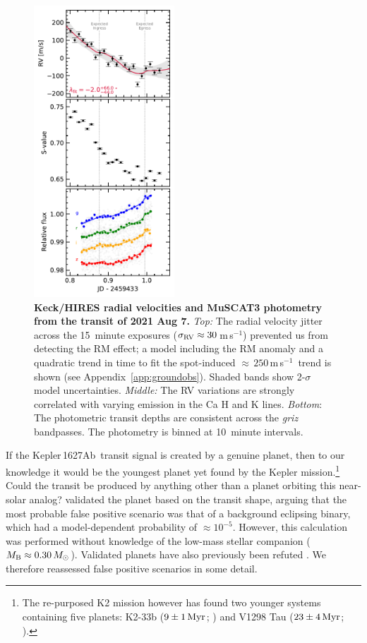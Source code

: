 \documentclass[12pt,modern,twocolumn,tighten]{aastex63}
\newcommand{\pn}{Kepler\,1627Ab} %
\newcommand{\ms}{\,m\,s$^{-1}$}
\begin{document}
\begin{figure}[tp]
	\begin{center}
		\leavevmode
		\includegraphics[width=0.47\textwidth]{f7.pdf}
	\end{center}
	\vspace{-0.7cm}
	\caption{
		{\bf Keck/HIRES radial velocities and MuSCAT3 photometry from the transit of 2021 Aug 7.}
		{\it Top:} 
		The radial velocity jitter across the 15~minute exposures
		($\sigma_{\rm RV}\approx30$\ms) prevented us from detecting the RM
		effect;
		a model including the RM anomaly and a quadratic trend in time to
		fit the spot-induced $\approx$\,$250$\ms\ trend is shown (see
		Appendix~\ref{app:groundobs}).  Shaded bands show 2-$\sigma$ model
		uncertainties.  
		{\it Middle:} The RV variations are strongly correlated with varying
		emission in the Ca H and K lines.
		{\it Bottom}: The photometric transit depths are consistent across
		the {\it griz} bandpasses. The photometry is binned at 10~minute
		intervals.
		\label{fig:ground}
	}
\end{figure}

If the \pn\ transit signal is created by a genuine planet,  then to
our knowledge it would be the youngest planet yet found by the
 Kepler mission.\footnote{The re-purposed K2 mission however has found
two younger systems containing five planets: K2-33b ($9\pm1\,{\rm
Myr}$; \citealt{Mann_K2_33b_2016,David_et_al_2017}) and V1298 Tau
($23\pm4\,{\rm Myr}$; \citealt{david_four_2019}).}   Could the transit
be produced by anything other than a planet orbiting this near-solar
analog?  \citet{morton_false_2016} validated the planet based on the
transit shape, arguing that the most probable false positive scenario
was that of a background eclipsing binary, which had a model-dependent
probability of $\approx$$10^{-5}$.  However, this calculation was
performed without knowledge of the low-mass stellar companion ($M_{\rm
B}\approx 0.30\,M_\odot$).  Validated planets have also previously
been refuted \citep[{\it e.g.},][]{shporer_three_2017}.  We therefore
reassessed false positive scenarios in some detail. 
\end{document}
